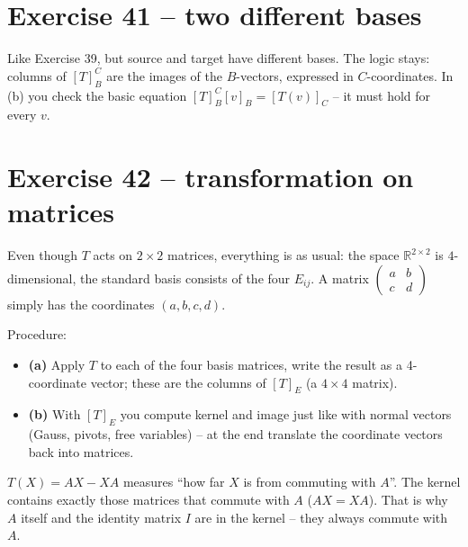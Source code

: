\documentclass[a4paper,12pt]{article}
\begin{document}
\section*{Exercise 41 -- two different bases}

Like Exercise 39, but source and target have different bases. The logic stays: columns of $[T]_B^C$ are the images of the $B$-vectors, expressed in $C$-coordinates. In (b) you check the basic equation $[T]_B^C [v]_B = [T(v)]_C$ -- it must hold for every $v$.

\section*{Exercise 42 -- transformation on matrices}

\begin{merkbox}[title={Trick}]
Even though $T$ acts on $2\times 2$ matrices, everything is as usual: the space $\mathbb{R}^{2\times 2}$ is $4$-dimensional, the standard basis consists of the four $E_{ij}$. A matrix $\left(\begin{smallmatrix} a & b \\ c & d \end{smallmatrix}\right)$ simply has the coordinates $(a, b, c, d)$.
\end{merkbox}

Procedure:
\begin{itemize}[leftmargin=*, nosep]
    \item \textbf{(a)} Apply $T$ to each of the four basis matrices, write the result as a 4-coordinate vector; these are the columns of $[T]_E$ (a $4\times 4$ matrix).
    \item \textbf{(b)} With $[T]_E$ you compute kernel and image just like with normal vectors (Gauss, pivots, free variables) -- at the end translate the coordinate vectors back into matrices.
\end{itemize}

\begin{analogie}
$T(X) = AX - XA$ measures ``how far $X$ is from commuting with $A$''. The kernel contains exactly those matrices that commute with $A$ ($AX = XA$). That is why $A$ itself and the identity matrix $I$ are in the kernel -- they always commute with $A$.
\end{analogie}
\end{document}
